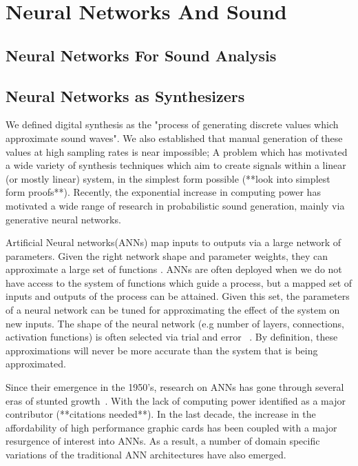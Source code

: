 \documentclass[\main/thesis.tex]{subfiles}
\begin{document}
\section{Neural Networks And Sound}
\subsection{Neural Networks For Sound Analysis}
\subsection{Neural Networks as Synthesizers}
We defined digital synthesis as the "process of generating discrete values which approximate sound waves". We also established that manual generation of these values at high sampling rates is near impossible; A problem which has motivated a wide variety of synthesis techniques which aim to create signals within a linear (or mostly linear) system, in the simplest form possible (**look into simplest form proofs**). Recently, the exponential increase in computing power has motivated a wide range of research in probabilistic sound generation, mainly via generative neural networks. 

Artificial Neural networks(ANNs) map inputs to outputs via a large network of parameters. Given the right network shape and parameter weights, they can approximate a large set of functions \cite{cybenko1989approximation,cardaliaguet1992approximation}. ANNs are often deployed when we do not have access to the system of functions which guide a process, but a mapped set of inputs and outputs of the process can be attained. Given this set, the parameters of a neural network can be tuned for approximating the effect of the system on new inputs. The shape of the neural network (e.g number of layers, connections, activation functions) is often selected via trial and error ~\cite{bergstra2012random,bergstra2011algorithms,ba2013adaptive}. By definition, these approximations will never be more accurate than the system that is being approximated. 

Since their emergence in the 1950's, research on ANNs has gone through several eras of stunted growth~\cite{basheer2000artificial,anderson1988neurocomputing}. With the lack of computing power identified as a major contributor (**citations needed**). In the last decade, the increase in the affordability of high performance graphic cards has been coupled with a major resurgence of interest into ANNs. As a result, a number of domain specific variations of the traditional ANN architectures have also emerged. 
\end{document}

